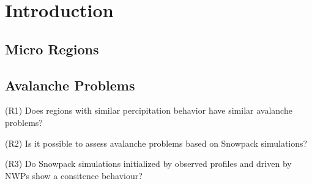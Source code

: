 \chapter{Introduction}
\label{sec:intro} 

%
\section{Micro Regions}
\label{subsec:MicroRegions}

\section{Avalanche Problems}


\begin{tcolorbox}[]
    (R1) Does regions with similar percipitation behavior have similar avalanche problems?
\end{tcolorbox}

\begin{tcolorbox}[]
    (R2) Is it possible to assess avalanche problems based on Snowpack simulations?
\end{tcolorbox}

\begin{tcolorbox}[]
    (R3) Do Snowpack simulations initialized by observed profiles and driven by NWPs 
    show a consitence behaviour?
    
\end{tcolorbox}



